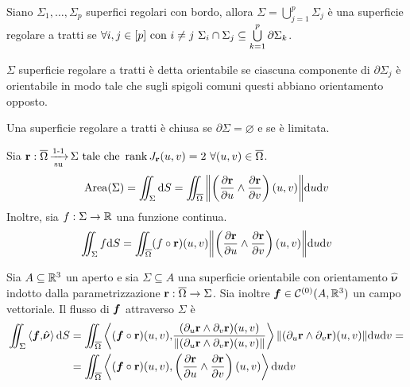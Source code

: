 \begin{definition}
	Siano $\Sigma_1,\dots,\Sigma_p$ superfici regolari con bordo, allora $\Sigma = \bigcup\limits_{j=1}^p \Sigma_j$ è una superficie regolare a tratti se $\forall i,j \in [p] \text{ con } i \neq j \ \Sigma_i \cap \Sigma_j \subseteq \bigcup\limits_{k=1}^p\partial \Sigma_k$.
\end{definition}

\begin{definition}
	$\Sigma$ superficie regolare a tratti è detta orientabile se ciascuna componente di $\partial \Sigma_j$ è orientabile in modo tale che sugli spigoli comuni questi abbiano orientamento opposto.
\end{definition}

\begin{definition}
	Una superficie regolare a tratti è chiusa se $\partial \Sigma = \varnothing$ e se è limitata.
\end{definition}

\begin{definition}
	Sia $\vb{r}:\overline{\Omega} \operatorname{\xrightarrow[\operatorname{su}]{\operatorname{1-1}}} \Sigma \text{ tale che } \rank J_{\vb{r}}(u,v) = 2 \ \forall (u,v) \in \overline{\Omega}$.
	$$
		\operatorname{Area} (\Sigma) = \iint_\Sigma \dd S = \iint_{\overline{\Omega}} \norm{\left(\frac{\partial \vb{r}}{\partial u}\wedge \frac{\partial \vb{r}}{\partial v}\right)(u,v)}\dd u \dd v
	$$
	Inoltre, sia $f: \Sigma \to \mathbb{R}$ una funzione continua.
	$$
		\iint_\Sigma f \dd S = \iint_{\overline{\Omega}}(f\circ\vb{r})(u,v)\norm{\left(\frac{\partial \vb{r}}{\partial u}\wedge \frac{\partial \vb{r}}{\partial v}\right)(u,v)}\dd u \dd v
	$$
\end{definition}

\begin{definition}
	[Flusso]
	Sia $A\subseteq \mathbb{R}^3$ un aperto e sia $\Sigma \subseteq A$ una superficie orientabile con orientamento $\hat{\bm \nu}$ indotto dalla parametrizzazione $\vb{r}:\overline{\Omega}\to\Sigma$. Sia inoltre $\bm f \in \mathcal{C}^{(0)}(A,\mathbb{R}^3)$ un campo vettoriale. Il flusso di $\bm f$ attraverso $\Sigma$ è
	\begin{align*}
		\iint_\Sigma \left\langle\bm f{,}\hat{\bm\nu}\right\rangle\dd S 
		&=\iint_{\overline{\Omega}}\left\langle(\bm f\circ\vb{r})(u,v){,}\frac{(\partial_u\vb{r}\wedge\partial_v\vb{r})(u,v)}{\norm{(\partial_u\vb{r}\wedge\partial_v\vb{r})(u,v)}}\right\rangle\norm{(\partial_u\vb{r}\wedge\partial_v\vb{r})(u,v)}\dd u \dd v=\\
		&= \iint_{\overline{\Omega}}\left\langle(\bm f\circ\vb{r})(u,v){,}\left(\frac{\partial \vb{r}}{\partial u} \wedge \frac{\partial \vb{r}}{\partial v}\right)(u,v)\right\rangle\dd u \dd v\\
	\end{align*}
\end{definition}

